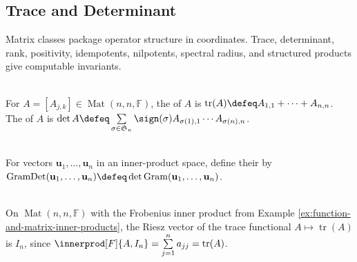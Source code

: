 \subsection{Trace and Determinant}

%

Matrix classes package operator structure in coordinates. Trace, determinant, rank, positivity, idempotents, nilpotents, spectral radius, and structured products give computable invariants.

\begin{definition} \label{def:matrix-trace-and-determinant} \\
For $A=[A_{j,k}]\in\operatorname{Mat}(n,n,\mathbb{F})$, the  of $A$ is $\operatorname{tr}(A)\defeq A_{1,1}+\cdots+A_{n,n}$.\\
The  of $A$ is $\det A \defeq \sum\limits_{\sigma\in\mathfrak{S}_n} \sign(\sigma)A_{\sigma(1),1}\cdots A_{\sigma(n),n}$.
\end{definition}

\begin{definition} \label{def:gram-determinant} \\
For vectors $\mathbf{u}_1,\ldots,\mathbf{u}_n$ in an inner-product space, define their  by $\operatorname{GramDet}(\mathbf{u}_1,\ldots,\mathbf{u}_n) \defeq \det \operatorname{Gram}(\mathbf{u}_1,\ldots,\mathbf{u}_n)$.
\end{definition}

\begin{example} \label{ex:frobenius-trace-riesz-vector} \\
On $\operatorname{Mat}(n,n,\mathbb{F})$ with the Frobenius inner product from Example \ref{ex:function-and-matrix-inner-products}, the Riesz vector of the trace functional $A\mapsto\operatorname{tr}(A)$ is $I_n$, since $\innerprod[F]{A,I_n}=\sum\limits_{j=1}^{n}a_{jj}=\operatorname{tr}(A)$.
\end{example}

